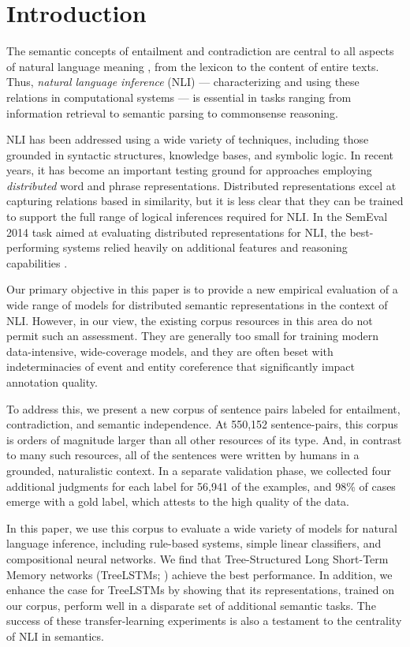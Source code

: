 \section{Introduction}\label{sec:introduction}

The semantic concepts of entailment and contradiction are central to
all aspects of natural language meaning
\cite{Katz72,vanBenthem08NATLOG}, from the lexicon to the content of
entire texts. Thus, \emph{natural language
  inference} (NLI) --- characterizing and using these relations in
computational systems
\cite{dagan2006pascal,MacCartney09,maccartney2009extended} --- is
essential in tasks ranging from information retrieval to semantic
parsing to commonsense reasoning.

NLI has been addressed using a wide variety of techniques, including
those grounded in syntactic structures, knowledge bases, and symbolic
logic. In recent years, it has become an important testing ground for
approaches employing \emph{distributed} word and phrase
representations. Distributed representations excel at capturing
relations based in similarity, but it is less clear that they can be
trained to support the full range of logical inferences required for
NLI. In the SemEval 2014 task aimed at evaluating distributed
representations for NLI, the best-performing systems relied heavily on
additional features and reasoning capabilities
\cite{marelli2014semeval}.

Our primary objective in this paper is to provide a new empirical
evaluation of a wide range of models for distributed semantic
representations in the context of NLI. However, in our view, the
existing corpus resources in this area do not permit such an
assessment. They are generally too small for training modern
data-intensive, wide-coverage models, and they are often beset with
indeterminacies of event and entity coreference that significantly
impact annotation quality.

To address this, we present a new corpus of sentence pairs labeled for
entailment, contradiction, and semantic independence. At 550,152
sentence-pairs, this corpus is orders of magnitude larger than all
other resources of its type. And, in contrast to many such resources,
all of the sentences were written by humans in a grounded,
naturalistic context. In a separate validation phase, we collected
four additional judgments for each label for 56,941 of the examples,
and 98\% of cases emerge with a gold label, which attests to the high
quality of the data.

In this paper, we use this corpus to evaluate a wide variety of models
for natural language inference, including rule-based systems, simple
linear classifiers, and compositional neural networks. We find that
Tree-Structured Long Short-Term Memory networks (TreeLSTMs;
\citealt{tai2015improved,le2015compositional}) achieve the best
performance. In addition, we enhance the case for TreeLSTMs by showing
that its representations, trained on our corpus, perform well in a
disparate set of additional semantic tasks.  The success of these
transfer-learning experiments is also a testament to the centrality
of NLI in semantics.


